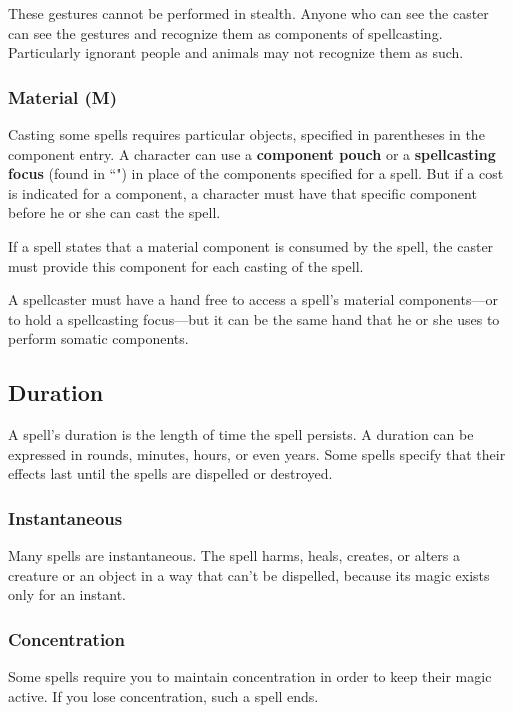 These gestures cannot be performed in stealth. Anyone who can see the caster can see the gestures and recognize them as components of spellcasting. Particularly ignorant people and animals may not recognize them as such.

\subsubsection{Material (M)}

Casting some spells requires particular objects, specified in parentheses in the component entry. A character can use a \textbf{component pouch} or a \textbf{spellcasting focus} (found in “") in place of the components specified for a spell. But if a cost is indicated for a component, a character must have that specific component before he or she can cast the spell.

If a spell states that a material component is consumed by the spell, the caster must provide this component for each casting of the spell.

A spellcaster must have a hand free to access a spell's material components—or to hold a spellcasting focus—but it can be the same hand that he or she uses to perform somatic components.

\subsection{Duration}

A spell's duration is the length of time the spell persists. A duration can be expressed in rounds, minutes, hours, or even years. Some spells specify that their effects last until the spells are dispelled or destroyed.

\subsubsection{Instantaneous}

Many spells are instantaneous. The spell harms, heals, creates, or alters a creature or an object in a way that can't be dispelled, because its magic exists only for an instant.

\subsubsection{Concentration}

Some spells require you to maintain concentration in order to keep their magic active. If you lose concentration, such a spell ends.

